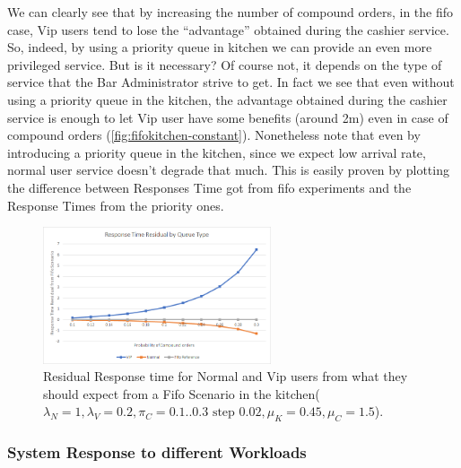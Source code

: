 We can clearly see that by increasing the number of compound orders, in the fifo case, Vip users tend to lose the ``advantage'' obtained during the cashier service. So, indeed, by using a priority queue in kitchen we can provide an even more privileged service. But is it necessary? Of course not, it depends on the type of service that the Bar Administrator strive to get. In fact we see that even without using a priority queue in the kitchen, the advantage obtained during the cashier service is enough to let Vip user have some benefits (around 2m) even in case of compound orders (\cref{fig:fifokitchen-constant}). Nonetheless note that even by introducing a priority queue in the kitchen, since we expect low arrival rate, normal user service doesn't degrade that much. This is easily proven by plotting the difference between Responses Time got from fifo experiments and the Response Times from the priority ones. 

\begin{figure}[h!]
    \centering
    \includegraphics[width=0.6\textwidth]{figs/responseTimeResidualKitchen.png}
    \caption{Residual Response time for Normal and Vip users from what they should expect from a Fifo Scenario in the kitchen($\lambda_N=1,\lambda_V=0.2,\pi_C={{0.1..0.3 \text{ step } 0.02}}, \mu_K=0.45, \mu_C=1.5$).}
    \label{}
\end{figure}

\subsubsection{System Response to different Workloads}

